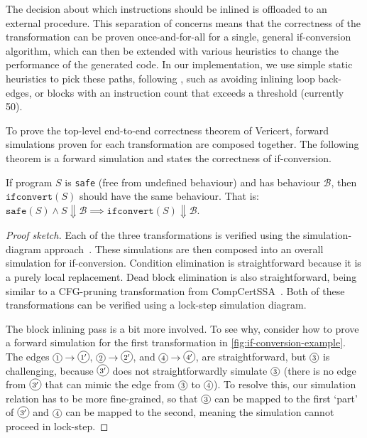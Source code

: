 \noindent
The decision about which  instructions should be inlined is offloaded
to an external procedure.
This separation of concerns means that the correctness of the transformation can
be proven once-and-for-all for a single, general if-conversion algorithm, which
can then be extended with various heuristics to change the performance of the
generated code.  In our implementation, we use simple static heuristics to pick
these paths, following \textcite{ball93_branc_predic_free}, such as avoiding
inlining loop back-edges, or blocks with an instruction count that exceeds a
threshold (currently
50).

To prove the top-level end-to-end correctness theorem of Vericert, forward simulations proven for each transformation are composed together.  The following theorem is a forward simulation and states the correctness of if-conversion.

\begin{theorem}\label{def:forwardsim}
  If program $S$ is {\normalfont\texttt{safe}} (free from
  undefined behaviour) and has behaviour
  $\mathcal{B}$, then {\normalfont $\texttt{ifconvert}(S)$} should have the same behaviour. That is: {\normalfont $\texttt{safe}(S) \land S \Downarrow \mathcal{B} \implies \texttt{ifconvert}(S) \Downarrow \mathcal{B}$}.

  \begin{proof}[Proof sketch]
    Each of the three transformations is verified using the simulation-diagram
    approach~\cite[p.~379]{leroy09_formal_verif_compil_back_end}. These
    simulations are then composed into an overall simulation for if-conversion.
    Condition elimination is straightforward because it is a purely local
    replacement.
    Dead block elimination is also straightforward, being similar to a
    CFG-pruning transformation from
    CompCertSSA~\cite{barthe14_formal_verif_ssa_based_middl_end_compc}.  Both of
    these transformations can be verified using a lock-step simulation diagram.

    The block inlining pass is a bit more involved.  To see why, consider how to
    prove a forward simulation for the first transformation in
    \cref{fig:if-conversion-example}. The edges
    $\diaglabel{$1$}\rightarrow\diaglabel{$1^\prime$}$,
    $\diaglabel{$2$}\rightarrow\diaglabel{$2^\prime$}$, and
    $\diaglabel{$4$}\rightarrow\diaglabel{$4^\prime$}$, are straightforward, but
    $\diaglabel{$3$}$ is challenging, because $\diaglabel{$3^\prime$}$ does not
    straightforwardly simulate $\diaglabel{$3$}$ (there is no edge from
    $\diaglabel{$3^\prime$}$ that can mimic the edge from $\diaglabel{$3$}$ to
    $\diaglabel{$4$}$). To resolve this, our simulation relation has to be more
    fine-grained, so that $\diaglabel{$3$}$ can be mapped to the first `part' of
    $\diaglabel{$3^\prime$}$ and $\diaglabel{$4$}$ can be mapped to the second, meaning the simulation cannot proceed in lock-step.
  \end{proof}
\end{theorem}

